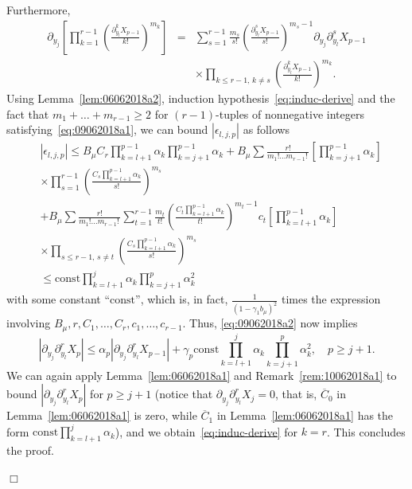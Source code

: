\documentclass[preprint]{imsart}
\newcommand{\proofendsign}{$\Box$}
\newenvironment{proof}{{\noindent \bf Proof }}
 {{\hspace*{\fill}\proofendsign\par\bigskip}}
\newcommand*{\const}{\mathrm{const}}
\newcommand*{\ol}{\overline}
\begin{document}
\begin{proof}
Furthermore,
\begin{eqnarray*}
\partial_{y_{j}}\left[\prod_{k=1}^{r-1}\left(\frac{\partial_{y_{l}}^{k}X_{p-1}}{k!}\right)^{m_{k}}\right]&=&\sum_{s=1}^{r-1}\frac{m_{s}}{s!}\left(\frac{\partial_{y_{l}}^{s}X_{p-1}}{s!}\right)^{m_{s}-1}\partial_{y_{j}}\partial_{y_{l}}^{s}X_{p-1}
\\
&& \times \prod_{k\le r-1,\,k\neq s}\left(\frac{\partial_{y_{l}}^{k}X_{p-1}}{k!}\right)^{m_{k}}.
\end{eqnarray*}
Using Lemma~\ref{lem:06062018a2},
induction hypothesis~\eqref{eq:induc-derive}
and the fact that $m_{1}+\ldots+m_{r-1}\ge2$
for $(r-1)$-tuples of nonnegative integers
satisfying~\eqref{eq:09062018a1},
we can bound $|\epsilon_{l,j,p}|$ as follows
\begin{align*}
&\left|\epsilon_{l,j,p}\right|  \leq  B_{\mu}C_{r}\prod_{k=l+1}^{p-1}\alpha_{k}\prod_{k=j+1}^{p-1}\alpha_{k}+B_{\mu}\sum\frac{r!}{m_{1}!\ldots m_{r-1}!\,}\left[\prod_{k=j+1}^{p-1}\alpha_{k}\right]
\\
&\times \prod_{s=1}^{r-1}\left(\frac{C_{s}\prod_{k=l+1}^{p-1}\alpha_{k}}{s!}\right)^{m_{s}}\\
&+B_{\mu}\sum\frac{r!}{m_{1}!\ldots m_{r-1}!\,}\sum_{t=1}^{r-1}\frac{m_t}{t!}\left(\frac{C_{t}\prod_{k=l+1}^{p-1}\alpha_{k}}{t!}\right)^{m_{t}-1}c_t\left[\prod_{k=l+1}^{p-1}\alpha_{k}\right]
\\
&\times \prod_{s\le r-1,\,s\neq t}\left(\frac{C_{s}\prod_{k=l+1}^{p-1}\alpha_{k}}{s!}\right)^{m_{s}}\\
& \leq \const\prod_{k=l+1}^{j}\alpha_{k}\prod_{k=j+1}^{p}\alpha_{k}^{2}
\end{align*}
with some constant ``$\const$'',
which is, in fact, $\frac1{(1-\gamma_1 b_\mu)^2}$ times
the expression involving
$B_\mu,r,C_1,\ldots,C_r,c_1,\ldots,c_{r-1}$.
Thus, \eqref{eq:09062018a2} now implies
$$
|\partial_{y_{j}}\partial_{y_{l}}^{r}X_{p}|
\le\alpha_p|\partial_{y_{j}}\partial_{y_{l}}^{r}X_{p-1}|
+\gamma_p \const\prod_{k=l+1}^{j}\alpha_{k}\prod_{k=j+1}^{p}\alpha_{k}^{2},
\quad p\ge j+1.
$$
We can again apply Lemma~\ref{lem:06062018a1}
and Remark~\ref{rem:10062018a1}
to bound $|\partial_{y_{j}}\partial_{y_{l}}^r X_{p}|$
for $p\ge j+1$
(notice that $\partial_{y_j}\partial_{y_l}^r X_j=0$, that is,
$\ol C_0$ in Lemma~\ref{lem:06062018a1} is zero,
while $\ol C_1$ in Lemma~\ref{lem:06062018a1}
has the form $\const\prod_{k=l+1}^j \alpha_k$),
and we obtain~\eqref{eq:induc-derive} for $k=r$.
This concludes the proof.
\end{proof}
\end{document}
